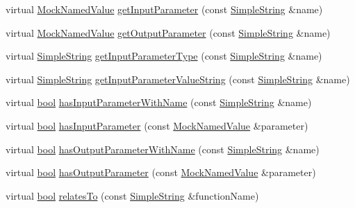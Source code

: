 \begin{DoxyCompactItemize}
\item 
virtual \hyperlink{class_mock_named_value}{Mock\+Named\+Value} \hyperlink{class_mock_checked_expected_call_aa9b79b2a96d0cfb8a8b970039dfecb1f}{get\+Input\+Parameter} (const \hyperlink{class_simple_string}{Simple\+String} \&name)
\item 
virtual \hyperlink{class_mock_named_value}{Mock\+Named\+Value} \hyperlink{class_mock_checked_expected_call_aec87bb7af98237bcd4a01993c9150b52}{get\+Output\+Parameter} (const \hyperlink{class_simple_string}{Simple\+String} \&name)
\item 
virtual \hyperlink{class_simple_string}{Simple\+String} \hyperlink{class_mock_checked_expected_call_a6d2d0ab878a45190e2d9fcaacfb22624}{get\+Input\+Parameter\+Type} (const \hyperlink{class_simple_string}{Simple\+String} \&name)
\item 
virtual \hyperlink{class_simple_string}{Simple\+String} \hyperlink{class_mock_checked_expected_call_a51604778be7825921e3aac3a0a2e3cb4}{get\+Input\+Parameter\+Value\+String} (const \hyperlink{class_simple_string}{Simple\+String} \&name)
\item 
virtual \hyperlink{avb__gptp_8h_af6a258d8f3ee5206d682d799316314b1}{bool} \hyperlink{class_mock_checked_expected_call_a0718a44ee4a248d2d831476fa32dc4d9}{has\+Input\+Parameter\+With\+Name} (const \hyperlink{class_simple_string}{Simple\+String} \&name)
\item 
virtual \hyperlink{avb__gptp_8h_af6a258d8f3ee5206d682d799316314b1}{bool} \hyperlink{class_mock_checked_expected_call_a5a02098daa018efb35f2574be4a9032e}{has\+Input\+Parameter} (const \hyperlink{class_mock_named_value}{Mock\+Named\+Value} \&parameter)
\item 
virtual \hyperlink{avb__gptp_8h_af6a258d8f3ee5206d682d799316314b1}{bool} \hyperlink{class_mock_checked_expected_call_ab9d908efa8490a014263c501761250e0}{has\+Output\+Parameter\+With\+Name} (const \hyperlink{class_simple_string}{Simple\+String} \&name)
\item 
virtual \hyperlink{avb__gptp_8h_af6a258d8f3ee5206d682d799316314b1}{bool} \hyperlink{class_mock_checked_expected_call_ac5c368885438bd980b1c0c33ed19f2b4}{has\+Output\+Parameter} (const \hyperlink{class_mock_named_value}{Mock\+Named\+Value} \&parameter)
\item 
virtual \hyperlink{avb__gptp_8h_af6a258d8f3ee5206d682d799316314b1}{bool} \hyperlink{class_mock_checked_expected_call_a78090443b9fbbb04a6876fb9eef35403}{relates\+To} (const \hyperlink{class_simple_string}{Simple\+String} \&function\+Name)
\item 

\end{DoxyCompactItemize}
